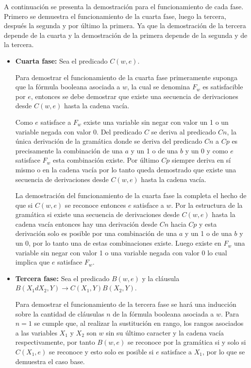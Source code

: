 \documentclass[12pt]{article}
\begin{document}
A continuación se presenta la demostración para el funcionamiento de cada fase. Primero se demuestra
el funcionamiento de la cuarta fase, luego la tercera, después la segunda y por último la primera.
Ya que la demostración de la tercera depende de la cuarta y la demostración de la primera depende de la
segunda y de la tercera.

\begin{itemize}
    \item \textbf{Cuarta fase:} Sea el predicado $C(w,e)$.

          Para demostrar el funcionamiento de la cuarta fase primeramente suponga que la fórmula booleana
          asociada a $w$, la cual se denomina $F_w$ es satisfacible por $e$, entonces se debe demostrar
          que existe una secuencia de derivaciones desde $C(w,e)$ hasta la cadena vacía.

          Como $e$ satisface a $F_w$ existe una variable sin negar con valor un 1 o un variable negada con valor 0.
          Del predicado $C$ se deriva al predicado $Cn$, la única derivación de la gramática donde se deriva del predicado $Cn$ a $Cp$ es precisamente
          la combinación de una $a$ y un 1 o de una $b$ y un 0 y como $e$ satisface $F_w$ esta combinación existe.
          Por último $Cp$ siempre deriva en sí mismo o en la cadena vacía por lo tanto queda demostrado que existe
          una secuencia de derivaciones desde $C(w,e)$ hasta la cadena vacía.

          La demostración del funcionamiento de la cuarta fase la completa el hecho de que si $C(w,e)$ se reconoce
          entonces $e$ satisface a $w$. Por la estructura de la gramática si existe una secuencia de derivaciones
          desde $C(w,e)$ hasta la cadena vacía entonces hay una derivación desde $Cn$ hacia $Cp$ y esta derivación
          solo es posible por una combinación de una $a$ y un 1 o de una $b$ y un 0, por lo tanto una de estas
          combinaciones existe. Luego existe en $F_w$ una variable sin negar con valor 1 o una variable negada
          con valor 0 lo cual implica que $e$ satisface $F_w$.

    \item \textbf{Tercera fase:} Sea el predicado $B(w,e)$ y la cláusula $B(X_1dX_2,Y)\to C(X_1,Y) B(X_2,Y)$.

          Para demostrar el funcionamiento de la tercera fase se hará una inducción sobre la cantidad de
          cláusulas $n$ de la fórmula booleana asociada a $w$. Para $n=1$ se cumple que, al realizar la sustitución
          en rango, los rangos asociados a las variables $X_1$ y $X_2$ son $w$ sin su último caracter y la cadena
          vacía respectivamente, por tanto $B(w,e)$ se reconoce por la gramática si y solo si $C(X_1,e)$ se reconoce
          y esto solo es posible si $e$ satisface a $X_1$, por lo que se demuestra el caso base.


\end{itemize}
\end{document}
